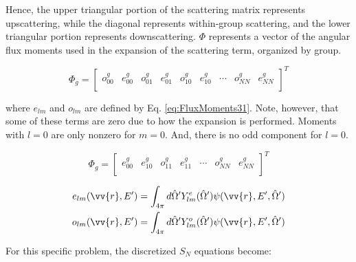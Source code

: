 \documentclass[10pt]{article}
\begin{document}
Hence, the upper triangular portion of the scattering matrix represents upscattering, while the diagonal represents within-group scattering, and the lower triangular portion represents downscattering. \(\Phi\) represents a vector of the angular flux moments used in the expansion of the scattering term, organized by group. 

\begin{equation}
\Phi_g=\begin{bmatrix}
o_{00}^g & e_{00}^g & o_{01}^g & e_{01}^g & o_{10}^g & e_{10}^g & \cdots & o_{NN}^g & e_{NN}^g\\
\end{bmatrix}^T
\end{equation}

where \(e_{lm}\) and \(o_{lm}\) are defined by Eq. \eqref{eq:FluxMoments31}. Note, however, that some of these terms are zero due to how the expansion is performed. Moments with \(l=0\) are only nonzero for \(m=0\). And, there is no odd component for \(l=0\). 

\begin{equation}
\Phi_g=\begin{bmatrix}
e_{00}^g & e_{10}^g & o_{11}^g & e_{11}^g & \cdots & o_{NN}^g & e_{NN}^g\\
\end{bmatrix}^T
\end{equation}

\begin{equation}
\label{eq:FluxMoments31}
\begin{aligned}
e_{lm}(\vv{r},E')=\int_{4\pi}^{}d\hat{\Omega}'Y_{lm}^e(\hat{\Omega}')\psi(\vv{r}, E',\hat{\Omega}')\\
o_{lm}(\vv{r},E')=\int_{4\pi}^{}d\hat{\Omega}'Y_{lm}^o(\hat{\Omega}')\psi(\vv{r}, E',\hat{\Omega}')\\
\end{aligned}
\end{equation}

For this specific problem, the discretized \(S_N\) equations become:
\end{document}
